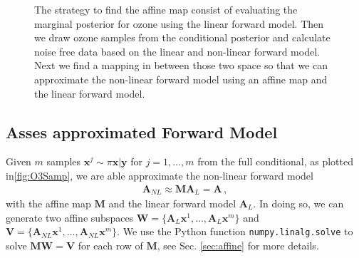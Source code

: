 \begin{figure}[htb!]
	\centering
	\caption[Strategy to find affine map.]{The strategy to find the affine map consist of evaluating the marginal posterior for ozone using the linear forward model. Then we draw ozone samples from the conditional posterior and calculate noise free data based on the linear and non-linear forward model. Next we find a mapping in between those two space so that we can approximate the non-linear forward model using an affine map and the linear forward model.}
	\label{fig:affinStrat}
\end{figure}

\subsection{Asses approximated Forward Model}
Given $m$ samples $\bm{x}^{j} \sim \pi{\bm{x}|\bm{y}}$ for $j = 1, \dots,m$ from the full conditional, as plotted in\ref{fig:O3Samp}, we are able approximate the non-linear forward model
\begin{align}
	\bm{A}_{NL} \approx \bm{M A}_L = \bm{A} \, ,
\end{align}
with the affine map $\bm{M}$ and the linear forward model $\bm{A}_L$.
In doing so, we can generate two affine subspaces $\bm{W} = \{\bm{A}_L\bm{x}^1, \dots, \bm{A}_L\bm{x}^m \}$ and $\bm{V} = \{\bm{A}_{NL}\bm{x}^1, \dots, \bm{A}_{NL}\bm{x}^m \}$.
We use the Python function \texttt{numpy.linalg.solve} to solve $ \bm{M}\bm{W} = \bm{V}$ for each row of $ \bm{M}$, see Sec. \ref{sec:affine} for more details.



